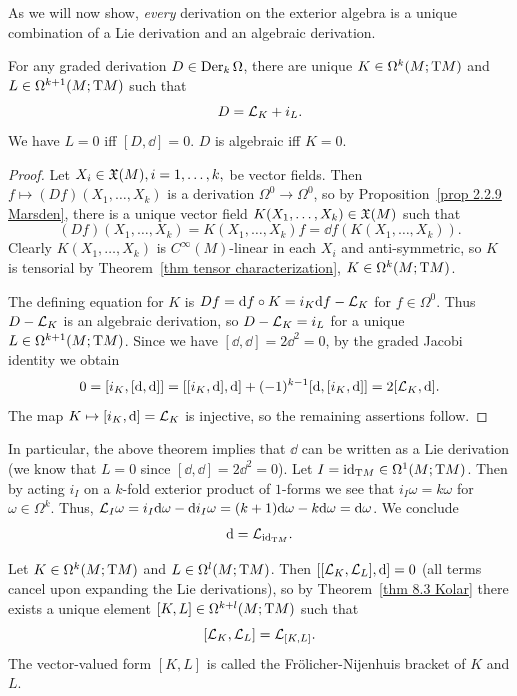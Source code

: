 As we will now show, \emph{every} derivation on the exterior algebra is a unique combination of a Lie derivation and an algebraic derivation.

\begin{thm}\label{thm 8.3 Kolar}
    For any graded derivation $D\in\operatorname{Der}_k\Omega$, there are unique $K\in\Omega^k(M;\mathrm{T} M)$ and $L\in\Omega^{k+1}(M;\mathrm{T} M)$ such that 
    \[D=\mathcal{L}_K+i_L.\]
    We have $L=0$ iff $[D,\dd]=0$. $D$ is algebraic iff $K=0$.
\end{thm}
\begin{proof}
    Let $X_i\in\mathfrak{X}(M),i=1,\ldots,k,$ be vector fields. Then $f\mapsto (Df)(X_1,\ldots,X_k)$ is a derivation $\Omega^0\to \Omega^0$, so by Proposition~\ref{prop 2.2.9 Marsden}, there is a unique vector field $K(X_1,\ldots,X_k)\in\mathfrak{X}(M)$ such that 
    \[(Df)(X_1,\ldots,X_k)=K(X_1,\ldots,X_k)f=\dd f(K(X_1,\ldots,X_k)).\]
    Clearly $K(X_1,\ldots,X_k)$ is $C^\infty(M)$-linear in each $X_i$ and anti-symmetric, so $K$ is tensorial by Theorem~\ref{thm tensor characterization}, $K\in\Omega^k(M;\mathrm{T} M)$.

    The defining equation for $K$ is $Df={\mathrm{d}} f\circ K=i_K{\mathrm{d}} f-\mathcal{L}_K$ for $f\in\Omega^0$. Thus $D-\mathcal{L}_K$ is an algebraic derivation, so $D-\mathcal{L}_K=i_L$ for a unique $L\in\Omega^{k+1}(M;\mathrm{T} M)$. Since we have $[\dd,\dd]=2\dd^2=0$, by the graded Jacobi identity we obtain
    \[0=[i_K,[{\mathrm{d}},{\mathrm{d}}]]=[[i_K,{\mathrm{d}}],{\mathrm{d}}]+(-1)^{k-1}[{\mathrm{d}},[i_K,{\mathrm{d}}]]=2[\mathcal{L}_K,{\mathrm{d}}].\]
    The map $K\mapsto [i_K,{\mathrm{d}}]=\mathcal{L}_K$ is injective, so the remaining assertions follow.
\end{proof}


\begin{rem}
    In particular, the above theorem implies that $\dd$ can be written as a Lie derivation (we know that $L=0$ since $[\dd,\dd]=2\dd^2=0$). Let $I=\operatorname{id}_{\mathrm{T} M}\in\Omega^1(M;\mathrm{T} M)$. Then by acting $i_I$ on a $k$-fold exterior product of $1$-forms we see that $i_I \omega=k\omega$ for $\omega\in\Omega^k$. Thus, $\mathcal{L}_{I}\omega=i_I{\mathrm{d}}\omega-{\mathrm{d}} i_I\omega=(k+1){\mathrm{d}}\omega-k{\mathrm{d}}\omega={\mathrm{d}}\omega$. We conclude
    \[{\mathrm{d}}=\mathcal{L}_{\operatorname{id}_{\mathrm{T} M}}.\]
\end{rem}

\begin{defn}
    Let $K\in\Omega^k(M;\mathrm{T} M)$ and $L\in\Omega^l(M;\mathrm{T} M)$. Then $[[\mathcal{L}_K,\mathcal{L}_L],{\mathrm{d}}]=0$ (all terms cancel upon expanding the Lie derivations), so by Theorem~\ref{thm 8.3 Kolar} there exists a unique element $[K,L]\in \Omega^{k+l}(M;\mathrm{T} M)$ such that 
    \[[\mathcal{L}_K,\mathcal{L}_L]=\mathcal{L}_{[K,L]}.\]
    The vector-valued form $[K,L]$ is called the Fr\"olicher-Nijenhuis bracket of $K$ and $L$.
\end{defn}


